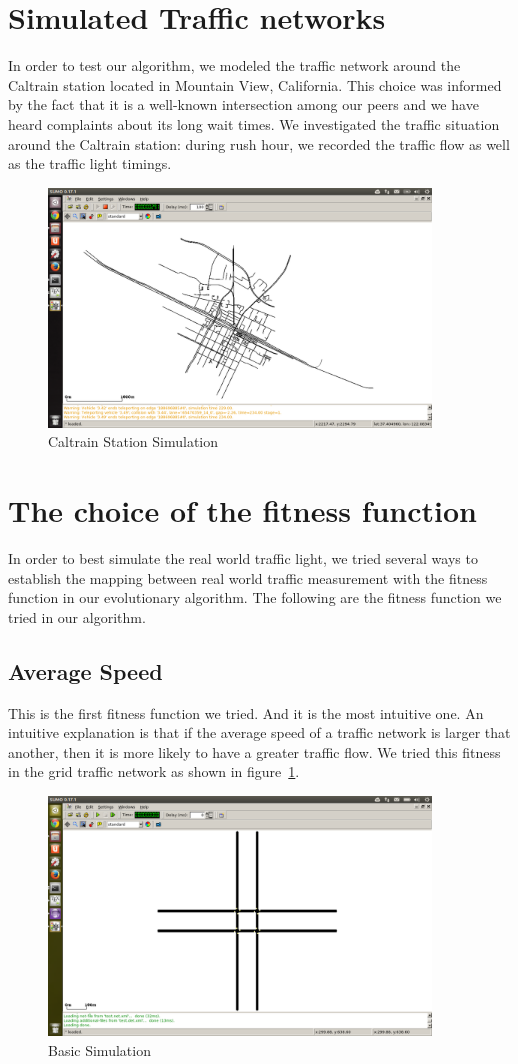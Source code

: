 \documentclass{article} %
\begin{document}
\section{Simulated Traffic networks}
In order to test our algorithm, we modeled the traffic network around the Caltrain station located in Mountain View, California. This choice was informed by the fact that it is a well-known intersection among our peers and we have heard complaints about its long wait times. We investigated the traffic situation around the Caltrain station: during rush hour, we recorded the traffic flow as well as the traffic light timings.
\begin{figure}
\includegraphics[width=4in]{images/simulator/caltrain.png}
\caption{Caltrain Station Simulation}
\end{figure}


\section{The choice of the fitness function}
In order to best simulate the real world traffic light, we tried several ways to establish the mapping between real world traffic measurement with the fitness function in our evolutionary algorithm. The following are the fitness function we tried in our algorithm.
\subsection{Average Speed}
This is the first fitness function we tried. And it is the most intuitive one. An intuitive explanation is that if the average speed of a traffic network is larger that another, then it is more likely to have a greater traffic flow. We tried this fitness in the grid traffic network as shown in figure~\ref{fig:gridoptimum}.

\begin{figure}
\includegraphics[width=4in]{images/simulator/gridoptimum.png}
\caption{Basic Simulation}
\label{fig:gridoptimum}
\end{figure}
\end{document}
